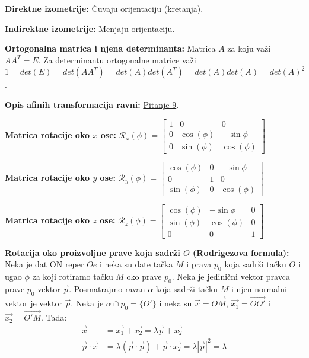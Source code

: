 \documentclass[12pt]{article}
\newcommand{\vek}[1]{\overrightarrow{#1}}
\begin{document}
\textbf{Direktne izometrije:} Čuvaju orijentaciju (kretanja).
\par

\textbf{Indirektne izometrije:} Menjaju orijentaciju.
\par

\textbf{Ortogonalna matrica i njena determinanta:} Matrica $A$ za koju važi
$AA^T=E$. Za determinantu ortogonalne matrice važi
$1=det(E)=det(AA^T)=det(A)det(A^T)=det(A)det(A)=det(A)^2$.
\par

\textbf{Opis afinih transformacija ravni:} \hyperref[subsec:pitanje_9]{Pitanje 9}.
\par

\textbf{Matrica rotacije oko $x$ ose:} $\mathcal{R}_x(\phi)=\begin{bmatrix}
        1 & 0          & 0           \\
        0 & \cos(\phi) & -\sin{\phi} \\
        0 & \sin(\phi) & \cos(\phi)
    \end{bmatrix}$
\par
\textbf{Matrica rotacije oko $y$ ose:} $\mathcal{R}_y(\phi)=\begin{bmatrix}
        \cos(\phi) & 0 & -\sin{\phi} \\
        0          & 1 & 0           \\
        \sin(\phi) & 0 & \cos(\phi)
    \end{bmatrix}$
\par
\textbf{Matrica rotacije oko $z$ ose:} $\mathcal{R}_z(\phi)=\begin{bmatrix}
        \cos(\phi) & -\sin{\phi} & 0 \\
        \sin(\phi) & \cos(\phi)  & 0 \\
        0          & 0           & 1
    \end{bmatrix}$
\par
\textbf{Rotacija oko proizvoljne prave koja sadrži $O$ (Rodrigezova formula):}
Neka je dat ON reper $Oe$ i neka su date tačka $M$ i prava $p_0$ koja sadrži
tačku $O$ i ugao $\phi$ za koji rotiramo tačku $M$ oko prave
$p_0$. Neka je jedinični vektor pravca prave $p_0$ vektor $\vek{p}$. Posmatrajmo
ravan $\alpha$ koja sadrži tačku $M$ i njen normalni vektor je vektor
$\vek{p}$. Neka je $\alpha\cap p_0 =\{O'\}$ i neka su $\vek{x}=\vek{OM}$,
$\vek{x_1}=\vek{OO'}$ i $\vek{x_2}=\vek{O'M}$. Tada:
\begin{align*}
    \vek{x}             & =\vek{x_1}+\vek{x_2} = \lambda\vek{p}+\vek{x_2}                                  \\
    \vek{p}\cdot\vek{x} & =\lambda(\vek{p}\cdot\vek{p})+\vek{p}\cdot\vek{x_2} =\lambda|\vek{p}|^2 =\lambda
\end{align*}
\end{document}
